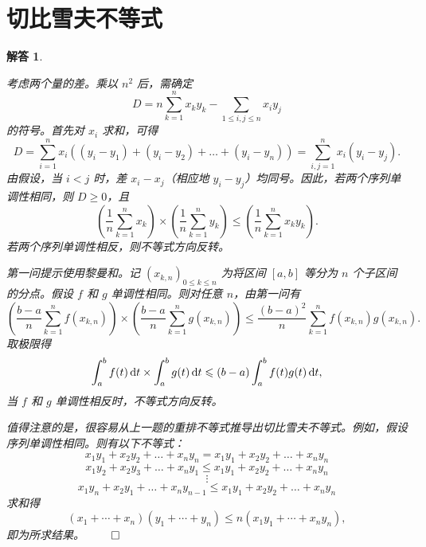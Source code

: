 \documentclass[12pt,UTF8,fontset=none]{ctexbook}
\theoremstyle{exercisestyle}
\theoremstyle{solutionstyle}
\newtheorem*{solution*}{解答}
\newenvironment{solution}
  {\begin{solution*}}
  {\hfill\ensuremath{\qed}\end{solution*}}
\begin{document}
\section{切比雪夫不等式}
\begin{solution}
  \begin{subquestions}
    \item 考虑两个量的差。乘以 \(n^2\) 后，需确定
    \[
    D = n \sum_{k=1}^{n} x_k y_k - \sum_{1 \leqslant i,j \leqslant n} x_i y_j
    \]
    的符号。首先对 \(x_i\) 求和，可得
    \[
    D = \sum_{i=1}^{n} x_i \left( (y_i - y_1) + (y_i - y_2) + \dots + (y_i - y_n) \right) = \sum_{i,j=1}^{n} x_i (y_i - y_j).
    \]
    由假设，当 \(i < j\) 时，差 \(x_i - x_j\)（相应地 \(y_i - y_j\)）均同号。因此，若两个序列单调性相同，则 \(D \geqslant 0\)，且
    \[
    \left(\frac{1}{n}\sum_{k=1}^n x_k\right) \times \left(\frac{1}{n}\sum_{k=1}^n y_k\right) \leqslant \left(\frac{1}{n}\sum_{k=1}^n x_k y_k\right).
    \]
    若两个序列单调性相反，则不等式方向反转。
    \item 第一问提示使用黎曼和。记 \((x_{k,n})_{0\leq k\leq n}\) 为将区间 \([a, b]\) 等分为 \(n\) 个子区间的分点。假设 \(f\) 和 \(g\) 单调性相同。则对任意 \(n\)，由第一问有
    \[
    \left(\frac{b-a}{n}\sum_{k=1}^n f(x_{k,n})\right) \times \left(\frac{b-a}{n}\sum_{k=1}^n g(x_{k,n})\right) \leqslant \frac{(b-a)^2}{n}\sum_{k=1}^n f(x_{k,n})g(x_{k,n}).
    \]
    取极限得
    \[
    \int_{a}^{b} f(t) \,\mathrm{d}t \times \int_{a}^{b} g(t) \,\mathrm{d}t \leqslant (b-a)\int_{a}^{b} f(t)g(t) \,\mathrm{d}t,
    \]
    当 \(f\) 和 \(g\) 单调性相反时，不等式方向反转。
  \end{subquestions}
  值得注意的是，很容易从上一题的重排不等式推导出切比雪夫不等式。例如，假设序列单调性相同。则有以下不等式：
  \[
  x_1y_1 + x_2y_2 + \dots + x_ny_n = x_1y_1 + x_2y_2 + \dots + x_ny_n
  \]
  \[
  x_1y_2 + x_2y_3 + \dots + x_ny_1 \leqslant x_1y_1 + x_2y_2 + \dots + x_ny_n
  \]
  \[
  \vdots
  \]
  \[
  x_1y_n + x_2y_1 + \dots + x_ny_{n-1} \leqslant x_1y_1 + x_2y_2 + \dots + x_ny_n
  \]
  求和得
  \[
  (x_1 + \cdots + x_n)(y_1 + \cdots + y_n) \leqslant n(x_1y_1 + \cdots + x_ny_n),
  \]
  即为所求结果。
\end{solution}
\end{document}
